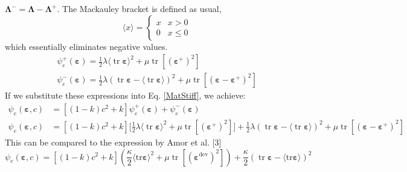 \documentclass[12pt,3p]{article}
\numberwithin{equation}{section}
\begin{document}
$\boldsymbol{\Lambda}^{-}=\boldsymbol{\Lambda}-\boldsymbol{\Lambda}^{+}$. The Mackauley bracket is defined as usual, 
\begin{equation}\label{MacBracket}
\langle x\rangle=\left\{\begin{array}{ll}
x & x>0 \\
0 & x \leq 0
\end{array}\right.
\end{equation}
which essentially eliminates negative values. 
\begin{equation}
\begin{array}{l}
\psi_{e}^{+}(\boldsymbol{\varepsilon})=\frac{1}{2} \lambda\langle\operatorname{tr} \boldsymbol{\varepsilon}\rangle^{2}+\mu \operatorname{tr}\left[\left(\boldsymbol{\varepsilon}^{+}\right)^{2}\right] \\
\psi_{e}^{-}(\boldsymbol{\varepsilon})=\frac{1}{2} \lambda(\operatorname{tr} \boldsymbol{\varepsilon}-\langle\operatorname{tr} \boldsymbol{\varepsilon}\rangle)^{2}+\mu \operatorname{tr}\left[\left(\boldsymbol{\varepsilon}-\boldsymbol{\varepsilon}^{+}\right)^{2}\right]
\end{array}
\end{equation}
If we substitute these expressions into Eq. \ref{MatStiff}, we achieve:
\begin{align*}
\psi_{e}(\boldsymbol{\varepsilon}, c) &= \left[(1-k) c^{2}+k\right] \psi_{e}^{+}(\boldsymbol{\varepsilon})+\psi_{e}^{-}(\boldsymbol{\varepsilon}) \\
\psi_{e}(\boldsymbol{\varepsilon}, c) &= \left[(1-k) c^{2}+k\right] \bigg[ \frac{1}{2} \lambda\langle\operatorname{tr} \boldsymbol{\varepsilon}\rangle^{2}+\mu \operatorname{tr}\left[\left(\boldsymbol{\varepsilon}^{+}\right)^{2}\right] \bigg] +\frac{1}{2} \lambda(\operatorname{tr} \boldsymbol{\varepsilon}-\langle\operatorname{tr} \boldsymbol{\varepsilon}\rangle)^{2}+\mu \operatorname{tr}\left[\left(\boldsymbol{\varepsilon}-\boldsymbol{\varepsilon}^{+}\right)^{2}\right]
\end{align*}
This can be compared to the expression by Amor et al. [3]
\begin{equation}
\psi_{e}(\boldsymbol{\varepsilon}, c)=\left[(1-k) c^{2}+k\right]\left(\frac{\kappa}{2}\langle\mathrm{tr} \boldsymbol{\varepsilon}\rangle^{2}+\mu \operatorname{tr}\left[\left(\boldsymbol{\varepsilon}^{\mathrm{dev}}\right)^{2}\right]\right) + \frac{\kappa}{2}(\operatorname{tr} \boldsymbol{\varepsilon}-\langle\mathrm{tr} \boldsymbol{\varepsilon}\rangle)^{2}
\end{equation}
\end{document}
